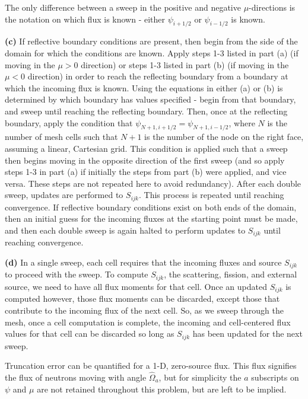 \documentclass[10pt]{article}
\newcommand*\circled[1]{\tikz[baseline=(char.base)]{
            \node[shape=circle,draw,inner sep=2pt] (char) {#1};}}
\begin{document}
The only difference between a sweep in the positive and negative \(\mu\)-directions is the notation on which flux is known - either \(\psi_{i+1/2}\) or \(\psi_{i-1/2}\) is known.\newline

\textbf{(c)} If reflective boundary conditions are present, then begin from the side of the domain for which the conditions are known. Apply steps 1-3 listed in part (a) (if moving in the \(\mu>0\) direction) or steps 1-3 listed in part (b) (if moving in the \(\mu<0\) direction) in order to reach the reflecting boundary from a boundary at which the incoming flux is known. Using the equations in either (a) or (b) is determined by which boundary has values specified - begin from that boundary, and sweep until reaching the reflecting boundary. Then, once at the reflecting boundary, apply the condition that \(\psi_{N+1, i+1/2}=\psi_{N+1, i-1/2}\), where \(N\) is the number of mesh cells such that \(N+1\) is the number of the node on the right face, assuming a linear, Cartesian grid. This condition is applied such that a sweep then begins moving in the opposite direction of the first sweep (and so apply steps 1-3 in part (a) if initially the steps from part (b) were applied, and vice versa. These steps are not repeated here to avoid redundancy). After each double sweep, updates are performed to \(S_{ijk}\). This process is repeated until reaching convergence. If reflective boundary conditions exist on both ends of the domain, then an initial guess for the incoming fluxes at the starting point must be made, and then each double sweep is again halted to perform updates to \(S_{ijk}\) until reaching convergence.\newline

\textbf{(d)} In a single sweep, each cell requires that the incoming fluxes and source \(S_{ijk}\) to proceed with the sweep. To compute \(S_{ijk}\), the scattering, fission, and external source, we need to have all flux moments for that cell. Once an updated \(S_{ijk}\) is computed however, those flux moments can be discarded, except those that contribute to the incoming flux of the next cell. So, as we sweep through the mesh, once a cell computation is complete, the incoming and cell-centered flux values for that cell can be discarded so long as \(S_{ijk}\) has been updated for the next sweep.\newline

\circled{2} Truncation error can be quantified for a 1-D, zero-source flux. This flux signifies the flux of neutrons moving with angle \(\hat{\Omega}_a\), but for simplicity the \(a\) subscripts on \(\psi\) and \(\mu\) are not retained throughout this problem, but are left to be implied.\newline
\end{document}

